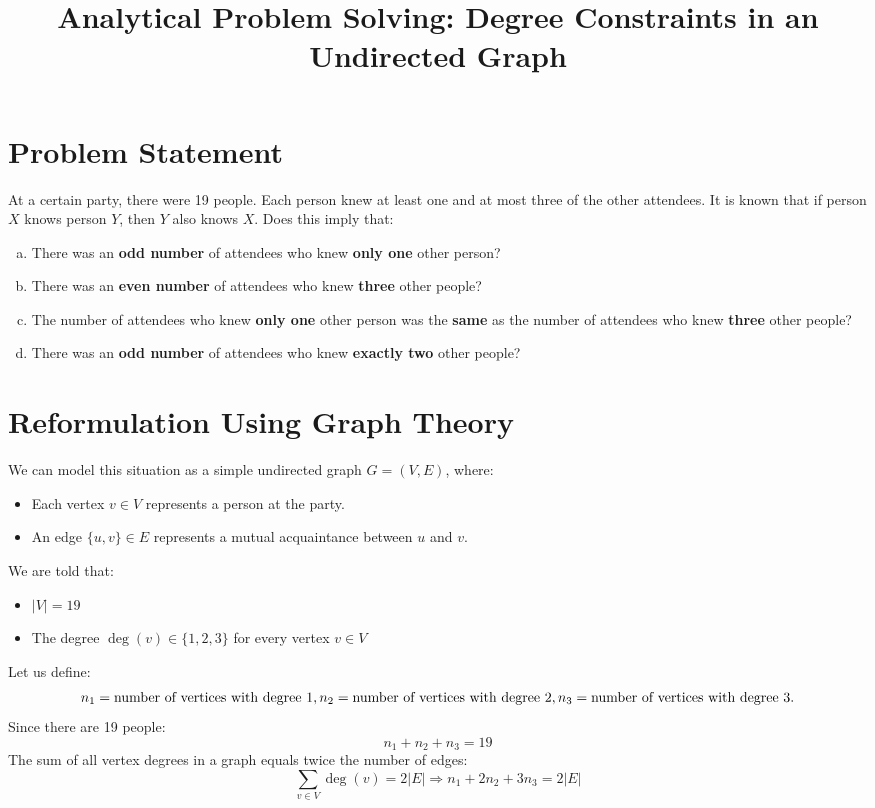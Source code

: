 \documentclass[12pt]{article}
\title{Analytical Problem Solving: Degree Constraints in an Undirected Graph}
\author{}
\date{}
\begin{document}
\maketitle

\section{Problem Statement}

At a certain party, there were 19 people. Each person knew at least one and at most three of the other attendees. It is known that if person $X$ knows person $Y$, then $Y$ also knows $X$. Does this imply that:

\begin{enumerate}[a)]
    \item There was an \textbf{odd number} of attendees who knew \textbf{only one} other person?
    \item There was an \textbf{even number} of attendees who knew \textbf{three} other people?
    \item The number of attendees who knew \textbf{only one} other person was the \textbf{same} as the number of attendees who knew \textbf{three} other people?
    \item There was an \textbf{odd number} of attendees who knew \textbf{exactly two} other people?
\end{enumerate}

\section{Reformulation Using Graph Theory}

We can model this situation as a simple undirected graph \( G = (V, E) \), where:
\begin{itemize}
    \item Each vertex \( v \in V \) represents a person at the party.
    \item An edge \( \{u, v\} \in E \) represents a mutual acquaintance between \( u \) and \( v \).
\end{itemize}

We are told that:
\begin{itemize}
    \item \( |V| = 19 \)
    \item The degree \( \deg(v) \in \{1,2,3\} \) for every vertex \( v \in V \)
\end{itemize}

Let us define:
\[
n_1 = \text{number of vertices with degree } 1, \\
n_2 = \text{number of vertices with degree } 2, \\
n_3 = \text{number of vertices with degree } 3.
\]
Since there are 19 people:
\[
n_1 + n_2 + n_3 = 19 \tag{1}
\]
The sum of all vertex degrees in a graph equals twice the number of edges:
\[
\sum_{v \in V} \deg(v) = 2|E| \Rightarrow n_1 + 2n_2 + 3n_3 = 2|E| \tag{2}
\]
\end{document}
